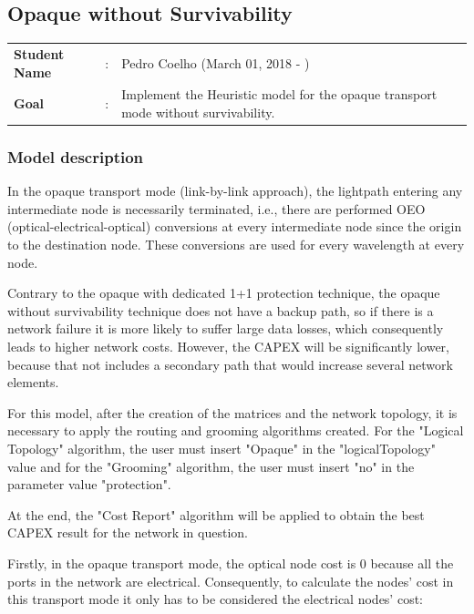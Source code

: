 \clearpage

\subsection{Opaque without Survivability}\label{heuristic_Opaque_Survivability}
\begin{tcolorbox}	
\begin{tabular}{p{2.75cm} p{0.2cm} p{10.5cm}} 	
\textbf{Student Name}  &:& Pedro Coelho    (March 01, 2018 - )\\
\textbf{Goal}          &:& Implement the Heuristic model for the opaque transport mode without survivability.
\end{tabular}
\end{tcolorbox}

\subsubsection{Model description}

\vspace{11pt}
In the opaque transport mode (link-by-link approach), the lightpath entering any intermediate node is necessarily terminated, i.e., there are performed OEO (optical-electrical-optical) conversions at every intermediate node since the origin to the destination node. These conversions are used for every wavelength at every node.

Contrary to the opaque with dedicated 1+1 protection technique, the opaque without survivability technique does not have a backup path, so if there is a network failure it is more likely to suffer large data losses, which consequently leads to higher network costs. However, the CAPEX will be significantly lower, because that not includes a secondary path that would increase several network elements.

For this model, after the creation of the matrices and the network topology, it is necessary to apply the routing and grooming algorithms created. For the "Logical Topology" algorithm, the user must insert "Opaque" in the "logicalTopology" value and for the "Grooming" algorithm, the user must insert "no" in the parameter value "protection".

At the end, the "Cost Report" algorithm will be applied to obtain the best CAPEX result for the network in question.

Firstly, in the opaque transport mode, the optical node cost is 0 because all the ports in the network are electrical. Consequently, to calculate the nodes' cost in this transport mode it only has to be considered the electrical nodes' cost:

